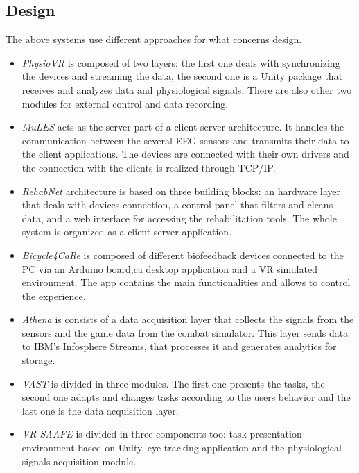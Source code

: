 \documentclass[binding=0.6cm,LaM]{sapthesis}
\begin{document}
\subsection{Design}
The above systems use different approaches for what concerns design. 

\begin{itemize}

\item \textit{PhysioVR} is composed of two layers: the first one deals with synchronizing the devices and streaming the data, the second one is a Unity package that receives and analyzes data and physiological signals. There are also other two modules for external control and data recording.

\item \textit{MuLES} acts as the server part of a client-server architecture. It handles the communication between the several EEG sensors and transmits their data to the client applications. The devices are connected with their own drivers and the connection with the clients is realized through TCP/IP.

\item \textit{RehabNet} architecture is based on three building blocks: an hardware layer that deals with devices connection, a control panel that filters and cleans data, and a web interface for accessing the rehabilitation tools. The whole system is organized as a client-server application.

\item \textit{Bicycle4CaRe} is composed of different biofeedback devices connected to the PC via an Arduino board,ca desktop application and a VR simulated environment. The app contains the main functionalities and allows to control the experience.

\item \textit{Athena} is consists of a data acquisition layer that collects the signals from the sensors and the game data from the combat simulator. This layer sends data to IBM's Infosphere Streams, that processes it and generates analytics for storage.

\item \textit{VAST} is divided in three modules. The first one presents the tasks, the second one adapts and changes tasks according to the users behavior and the last one is the data acquisition layer. 

\item \textit{VR-SAAFE} is divided in three components too: task presentation environment based on Unity, eye tracking application and the physiological signals acquisition module.

\end{itemize}
\end{document}
